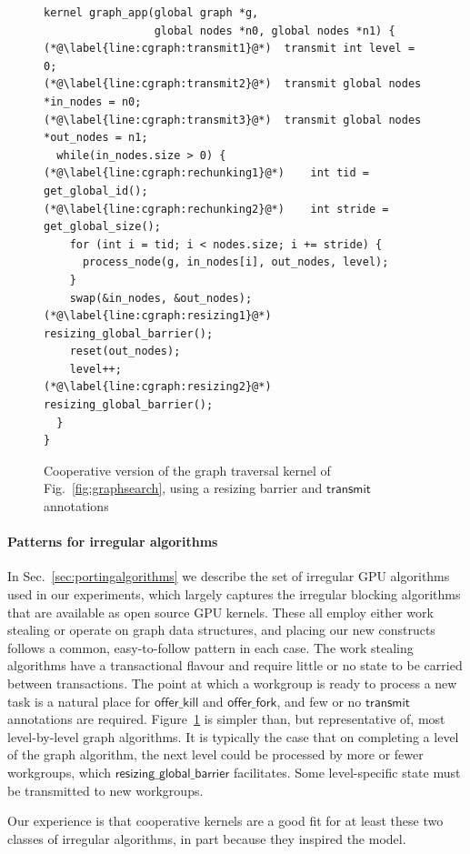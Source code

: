 \documentclass[numbers,nocopyrightspace,10pt]{sigplanconf}
\newcommand{\myfig}{Fig.~}
\newcommand{\myfiglong}{Figure~}
\newcommand{\mysec}{Sec.~}
\newcommand{\transmit}{\mathsf{transmit}}
\newcommand{\offerfork}{\mathsf{offer\_fork}}
\newcommand{\offerkill}{\mathsf{offer\_kill}}
\newcommand{\resizingglobalbarrier}{\mathsf{resizing\_global\_barrier}}
\begin{document}
\begin{figure}

\begin{lstlisting}
kernel graph_app(global graph *g, 
                 global nodes *n0, global nodes *n1) {
(*@\label{line:cgraph:transmit1}@*)  transmit int level = 0;
(*@\label{line:cgraph:transmit2}@*)  transmit global nodes *in_nodes = n0;
(*@\label{line:cgraph:transmit3}@*)  transmit global nodes *out_nodes = n1;
  while(in_nodes.size > 0) {
(*@\label{line:cgraph:rechunking1}@*)    int tid = get_global_id();
(*@\label{line:cgraph:rechunking2}@*)    int stride = get_global_size();
    for (int i = tid; i < nodes.size; i += stride) {
      process_node(g, in_nodes[i], out_nodes, level);
    }
    swap(&in_nodes, &out_nodes);
(*@\label{line:cgraph:resizing1}@*)    resizing_global_barrier();
    reset(out_nodes);
    level++;
(*@\label{line:cgraph:resizing2}@*)    resizing_global_barrier();
  }
}
\end{lstlisting}
\caption{Cooperative version of the graph traversal kernel of \myfig\ref{fig:graphsearch}, using a resizing barrier and $\transmit$ annotations}\label{fig:cgraphsearch}
\end{figure}

\paragraph{Patterns for irregular algorithms}
In \mysec\ref{sec:portingalgorithms} we describe the set of irregular GPU algorithms used
in our experiments, which largely captures the irregular blocking
algorithms that are available as open source GPU kernels.  These all
employ either work stealing or operate on graph data structures, and placing our new constructs follows a common, easy-to-follow pattern in each case.
%
The work stealing algorithms have a transactional flavour
and require little or no state to be carried between transactions.  The point at which a workgroup is ready to process a new task is a natural place for $\offerkill$ and $\offerfork$, and few or no $\transmit$ annotations are required.
%
\myfiglong\ref{fig:cgraphsearch} is simpler than, but representative of,
most level-by-level graph algorithms.
It is typically the case that on completing a level of
the graph algorithm, the next level could be processed by more or
fewer workgroups, which $\resizingglobalbarrier$
facilitates.  Some level-specific state must be transmitted to new workgroups.

Our experience is that cooperative kernels are a good
fit for at least these two classes of irregular algorithms, in part because they inspired the model.
\end{document}

